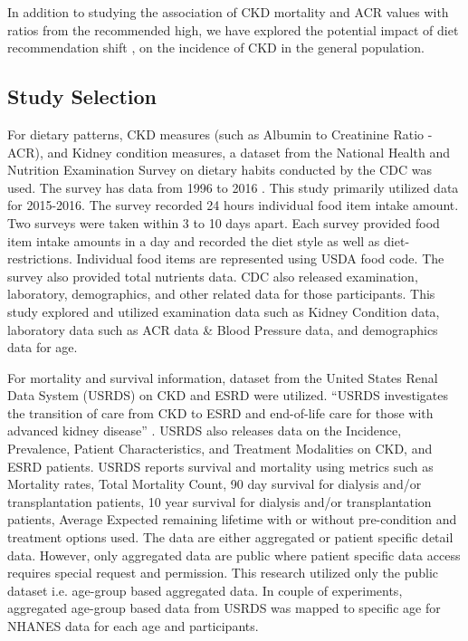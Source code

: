 \noindent In addition to studying the association of CKD mortality and ACR values with ratios from the recommended high, we have explored the potential impact of diet recommendation shift \cite{HealthGov2015}, on the incidence of CKD in the general population.

\subsection{Study Selection}

\noindent For dietary patterns, CKD measures (such as Albumin to Creatinine Ratio - ACR), and Kidney condition measures, a dataset from the National Health and Nutrition Examination Survey on dietary habits conducted by the CDC \cite{CDC2015} was used. The survey has data from 1996 to 2016 \cite{CDC2015}. This study primarily utilized data for 2015-2016. The survey recorded 24 hours individual food item intake amount. Two surveys were taken within 3 to 10 days apart. Each survey provided food item intake amounts in a day and recorded the diet style as well as diet-restrictions. Individual food items are represented using USDA food code. The survey also provided total nutrients data. CDC also released examination, laboratory, demographics, and other related data for those participants. This study explored and utilized examination data such as Kidney Condition data, laboratory data such as ACR data \& Blood Pressure data, and demographics data for age.
 
\noindent For mortality and survival information, dataset from the United States Renal Data System (USRDS) on CKD and ESRD \cite{USRDS2015} \cite{USRDS2018} were utilized. “USRDS investigates the transition of care from CKD to ESRD and end-of-life care for those with advanced kidney disease” \cite{USRDSAnnual2018}. USRDS also releases data on the Incidence, Prevalence, Patient Characteristics, and Treatment Modalities on CKD, and ESRD patients. USRDS  reports survival and mortality using metrics such as Mortality rates, Total Mortality Count,  90 day survival for dialysis and/or transplantation patients,  10 year survival for dialysis and/or transplantation patients, Average Expected remaining lifetime with or without pre-condition and treatment options used.  The data are either aggregated or patient specific detail data. However, only aggregated data are public where patient specific data access requires special request and permission. This research utilized only the public dataset i.e. age-group based aggregated data. In couple of experiments, aggregated age-group based data from USRDS was mapped to specific age for NHANES data for each age and participants.

